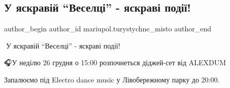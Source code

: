  
 
 
 
 

\subsection{У яскравій \enquote{Веселці} - яскраві події!}
\label{sec:25_12_2021.fb.mariupol.turystychne_misto.1.u_jaskravij_veselci_jaskravi_podii}

\ifcmt
 author_begin
   author_id mariupol.turystychne_misto
 author_end
\fi

\vspace{0.5cm}
\begin{minipage}{0.9\textwidth}
	
🌈У яскравій \enquote{Веселці} - яскраві події!

🎧У неділю 26 грудня о 15:00 розпочнеться діджей-сет  від  ALEXDUM

Запалюємо під Electro dance music у Лівобережному парку до 20:00.
\end{minipage}
\vspace{0.5cm}


